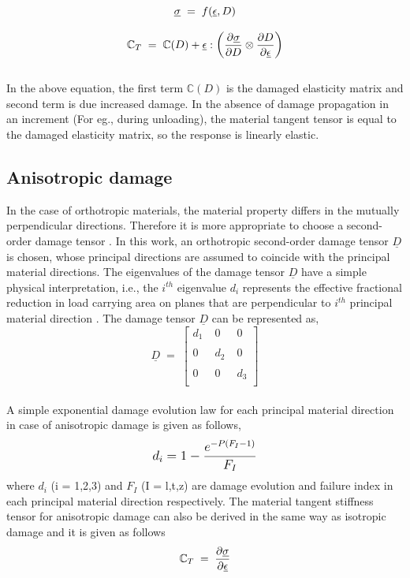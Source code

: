 \documentclass[12pt,a4paper,twoside,openright]{report}
\begin{document}
\begin{equation*}
\large{\underline{\sigma}  \; = \; f(\underline{ \epsilon}, D) }
\end{equation*}

\begin{equation}
\large{\mathbb{C}_{T}  \; = \; \mathbb{C}(D) + \underline{ \epsilon}  : \Big(\frac{\partial \underline{\sigma} }{\partial D} \otimes \frac{\partial D}{\partial \underline{ \epsilon}} \Big)    }
\end{equation}
\\
In the above equation, the first term $\mathbb{C}(D)$ is the damaged elasticity matrix and second term is due increased damage. In the absence of damage propagation in an increment (For eg., during unloading), the material tangent tensor is equal to the damaged elasticity matrix, so the response is linearly elastic.
\subsection{Anisotropic damage}
\indent\indent\indent In the case of orthotropic materials, the material property differs in the mutually perpendicular directions. Therefore it is more appropriate to choose a second-order damage tensor \citep{murakami2012continuum}. In this work, an orthotropic second-order damage tensor $\underline{D}$ is chosen, whose principal directions are assumed to coincide with the principal material directions. The eigenvalues of the damage tensor $\underline{D}$ have a simple physical interpretation, i.e., the $i^{th}$ eigenvalue $d_{i}$ represents the effective fractional reduction in load carrying area on planes that are perpendicular to $i^{th}$ principal material direction \citep{wang2009three}. The damage tensor $\underline{D}$ can be represented as,
\\
$$
\underline{D} \; = \; 
 \begin{bmatrix}
  d_{1}  \;& 0  \; & 0  \\
  \\
  0 \; & d_{2} \; & 0  \\
  \\  
  0 \; & 0 \; & d_{3} \\
  
 \end{bmatrix}
 $$  
\\
A simple exponential damage evolution law \citep{wang2009three} for each principal material direction in case of anisotropic damage is given as follows,
\begin{equation}
\mathlarger{d_{i} = 1 - \frac{e^{-P(F_{I} - 1)} }{F_{I}} } 
\label{exponential damage equation}
\end{equation}
where $d_{i}$ (i = 1,2,3) and $F_{I}$ (I = l,t,z) are damage evolution and failure index in each principal material direction respectively.
The material tangent stiffness tensor for anisotropic damage \citep{lapczyk2007progressive} can also be derived in the same way as isotropic damage and it is given as follows
\begin{equation*}
\large{ \mathbb{C}_{T}  \; = \;\frac{\partial \underline{\sigma} }{\partial \underline{ \epsilon} }  }
\end{equation*}
\end{document}
